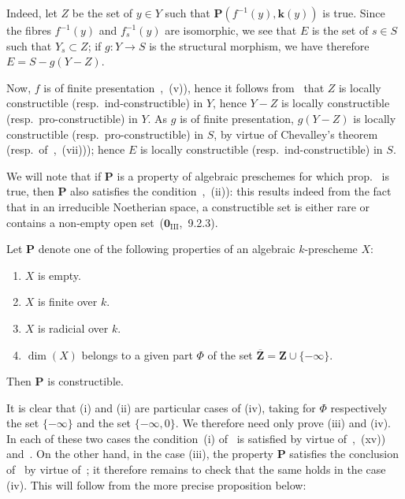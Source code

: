 Indeed, let $Z$ be the set of $y\in Y$ such that $\mathbf{P}(f^{-1}(y),\mathbf{k}(y))$ is true.
Since the fibres $f^{-1}(y)$ and $f_s^{-1}(y)$ are isomorphic, we see that $E$ is the set of $s\in S$ such that $Y_s\subset Z$; if $g:Y\to S$ is the structural morphism, we have therefore $E=S-g(Y-Z)$.


Now, $f$ is of finite presentation~,~(v)), hence it follows from~ that $Z$ is locally constructible (resp.\ ind-constructible) in $Y$, hence $Y-Z$ is locally constructible (resp.\ pro-constructible) in $Y$.
As $g$ is of finite presentation, $g(Y-Z)$ is locally constructible (resp.\ pro-constructible) in $S$, by virtue of Chevalley's theorem~ (resp.\ of~,~(vii))); hence $E$ is locally constructible (resp.\ ind-constructible) in $S$.

\begin{remark}[9.2.5]
\label{IV.9.2.5}
We will note that if $\mathbf{P}$ is a property of algebraic preschemes for which prop.~ is true, then $\mathbf{P}$ also satisfies the condition~,~(ii)): this results indeed from the fact that in an irreducible Noetherian space, a constructible set is either rare or contains a non-empty open set~($\mathbf{0}_{\mathrm{III}}$,~9.2.3).
\end{remark}

\begin{proposition}[9.2.6]
\label{IV.9.2.6}
Let $\mathbf{P}$ denote one of the following properties of an algebraic $k$-prescheme $X$:
\begin{enumerate}[label=(\roman*)]
  \item $X$ is empty.
  \item $X$ is finite over $k$.
  \item $X$ is radicial over $k$.
  \item $\dim(X)$ belongs to a given part $\Phi$ of the set $\overline{\mathbf{Z}}=\mathbf{Z}\cup\{-\infty\}$.
\end{enumerate}
Then $\mathbf{P}$ is constructible.
\end{proposition}

It is clear that (i) and (ii) are particular cases of (iv), taking for $\Phi$ respectively the set $\{-\infty\}$ and the set $\{-\infty,0\}$.
We therefore need only prove (iii) and (iv).
In each of these two cases the condition~(i) of~ is satisfied by virtue of~,~(xv)) and~.
On the other hand, in the case (iii), the property $\mathbf{P}$ satisfies the conclusion of~ by virtue of~; it therefore remains to check that the same holds in the case (iv).
This will follow from the more precise proposition below:

